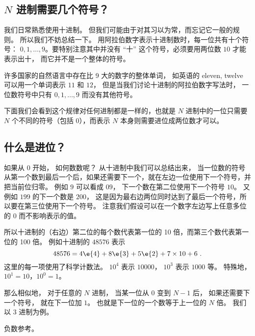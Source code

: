 
\begin{issues}
\issueDraft
\end{issues}

\subsection{$N$ 进制需要几个符号？}
我们日常熟悉使用十进制。 但我们可能由于对其习以为常，而忘记它一般的规则。 所以我们不妨总结一下。 用阿拉伯数字表示十进制数时，每一位共有十个符号： $0,1,\dots, 9$。要特别注意其中并没有 “十” 这个符号，必须要用两位数 $10$ 才能表示出十， 而它并不是一个整体的符号。

许多国家的自然语言中存在比 9 大的数字的整体单词， 如英语的 eleven, twelve 可以用一个单词表示 $11$ 和 $12$， 但是当我们讨论十进制的阿拉伯数字写法时， 一位数符号中只有 $0,1,\dots, 9$ 而没有其他符号。 

下面我们会看到这个规律对任何进制都是一样的，也就是 $N$ 进制中的一位只需要 $N$ 个不同的符号（包括 0），而表示 $N$ 本身则需要进位成两位数才可以。

\subsection{什么是进位？}
如果从 $0$ 开始， 如何数数呢？ 从十进制中我们可以总结出来， 当一位数的符号从第一个数到最后一个后，如果还需要下一个，就在左边一位使用下一个符号，并把当前位归零。 例如 $9$ 可以看成 $09$， 下一个数在第二位使用下一个符号 $10$。 又例如 $199$ 的下一个数是 $200$， 这是因为最右边两位同时达到了最后一个符号，所以要在第三位使用下一个符号。 注意我们假设可以在一个数字左边写上任意多位的 $0$ 而不影响表示的值。

所以十进制的（右边）第二位的每个数代表第一位的 10 倍，而第三个数代表第一位的 100 倍。 例如十进制的 $48576$ 表示
\begin{equation}
48576 = 4\e{4} + 8\e{3} + 5\e{2} + 7\times 10 + 6~.
\end{equation}
这里的每一项使用了科学计数法。%
$10^4$ 表示 $10000$， $10^3$ 表示 $1000$ 等。 特殊地， $10^1=10$，$10^0=1$。

那么相似地， 对于任意的 $N$ 进制， 当某一位从 $0$ 变到 $N-1$ 后， 如果还需要下一个符号， 就在下一位加 $1$。 也就是下一位的一个数等于上一位的 $N$ 倍。 我们以 3 进制为例。






负数参考。

